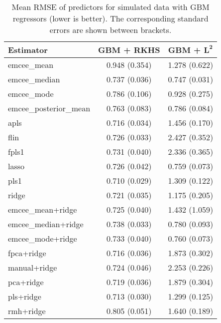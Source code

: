 \newpage

\begin{table}[htbp!]
  \centering
  \begin{tabular}{lcc}
\toprule
            \textbf{Estimator} &            \textbf{GBM + RKHS} &           \textbf{GBM + \(\symbf{L^2}\)} \\
\midrule
          emcee\_mean & 0.948 (0.354) & 1.278 (0.622) \\
        emcee\_median & 0.737 (0.036) & 0.747 (0.031) \\
          emcee\_mode & 0.786 (0.106) & 0.928 (0.275) \\
emcee\_posterior\_mean & 0.763 (0.083) & 0.786 (0.084) \\
                apls & 0.716 (0.034) & 1.456 (0.170) \\
                flin & 0.726 (0.033) & 2.427 (0.352) \\
               fpls1 & 0.731 (0.040) & 2.336 (0.365) \\
               lasso & 0.726 (0.042) & 0.759 (0.073) \\
                pls1 & 0.710 (0.029) & 1.309 (0.122) \\
               ridge & 0.721 (0.035) & 1.175 (0.205) \\

\bottomrule
\toprule
  emcee\_mean+ridge & 0.725 (0.040) & 1.432 (1.059) \\
emcee\_median+ridge & 0.738 (0.033) & 0.780 (0.093) \\
  emcee\_mode+ridge & 0.733 (0.040) & 0.760 (0.073) \\
        fpca+ridge & 0.716 (0.036) & 1.873 (0.302) \\
      manual+ridge & 0.724 (0.046) & 2.253 (0.226) \\
         pca+ridge & 0.719 (0.036) & 1.879 (0.304) \\
         pls+ridge & 0.713 (0.030) & 1.299 (0.125) \\
         rmh+ridge & 0.805 (0.051) & 1.640 (0.189) \\

\bottomrule
\end{tabular}
  \caption{Mean RMSE of predictors for simulated data with GBM regressors (lower is better). The corresponding standard errors are shown between brackets.}
\end{table}

\newpage

